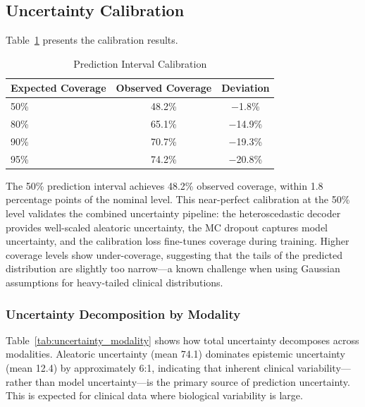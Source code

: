 \documentclass[journal,twoside,web]{ieeecolor}
\begin{document}
\subsection{Uncertainty Calibration}

Table~\ref{tab:calibration} presents the calibration results.

\begin{table}[t]
\centering
\caption{Prediction Interval Calibration}
\label{tab:calibration}
\begin{tabular}{lcc}
\toprule
\textbf{Expected Coverage} & \textbf{Observed Coverage} & \textbf{Deviation} \\
\midrule
50\% & 48.2\% & $-$1.8\% \\
80\% & 65.1\% & $-$14.9\% \\
90\% & 70.7\% & $-$19.3\% \\
95\% & 74.2\% & $-$20.8\% \\
\bottomrule
\end{tabular}
\end{table}

The 50\% prediction interval achieves 48.2\% observed coverage, within 1.8 percentage points of the nominal level. This near-perfect calibration at the 50\% level validates the combined uncertainty pipeline: the heteroscedastic decoder provides well-scaled aleatoric uncertainty, the MC dropout captures model uncertainty, and the calibration loss fine-tunes coverage during training. Higher coverage levels show under-coverage, suggesting that the tails of the predicted distribution are slightly too narrow---a known challenge when using Gaussian assumptions for heavy-tailed clinical distributions.

\subsubsection{Uncertainty Decomposition by Modality}

Table~\ref{tab:uncertainty_modality} shows how total uncertainty decomposes across modalities. Aleatoric uncertainty (mean 74.1) dominates epistemic uncertainty (mean 12.4) by approximately 6:1, indicating that inherent clinical variability---rather than model uncertainty---is the primary source of prediction uncertainty. This is expected for clinical data where biological variability is large.
\end{document}

